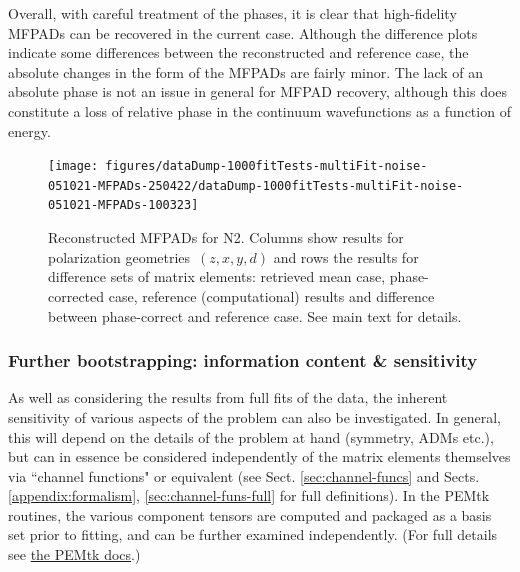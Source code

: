 \documentclass[10pt]{article}
\begin{document}
Overall, with careful treatment of the phases, it is clear that high-fidelity MFPADs can be recovered in the current case. Although the difference plots indicate some differences between the reconstructed and reference case, the absolute changes in the form of the MFPADs are fairly minor. The lack of an absolute phase is not an issue in general for MFPAD recovery, although this does constitute a loss of relative phase in the continuum wavefunctions as a function of energy. %

\begin{figure}[H]
\begin{center}
\texttt{[image: figures/dataDump-1000fitTests-multiFit-noise-051021-MFPADs-250422/dataDump-1000fitTests-multiFit-noise-051021-MFPADs-100323]}
\caption{{Reconstructed MFPADs for N2. Columns show results for polarization
geometries~\((z,x,y,d)\) and rows the results for difference sets
of matrix elements: retrieved mean case, phase-corrected case, reference
(computational) results and difference between phase-correct and
reference case. See main text for details.
{\label{454268}}%
}}
\end{center}
\end{figure}

\subsubsection{Further bootstrapping: information content \& sensitivity\label{sec:bootstrapping-info-sensitivity}}

As well as considering the results from full fits of the data, the inherent sensitivity of various aspects of the problem can also be investigated. In general, this will depend on the details of the problem at hand (symmetry, ADMs etc.), but can in essence be considered independently of the matrix elements themselves via ``channel functions" or equivalent (see Sect. \ref{sec:channel-funcs} and Sects. \ref{appendix:formalism}, \ref{sec:channel-funs-full} for full definitions). In the PEMtk routines, the various component tensors are computed and packaged as a basis set prior to fitting, and can be further examined independently. (For full details see \href{https://pemtk.readthedocs.io/en/latest/fitting/PEMtk_fitting_basis-set_demo_050621-full.html}{the PEMtk docs}.)
\end{document}
